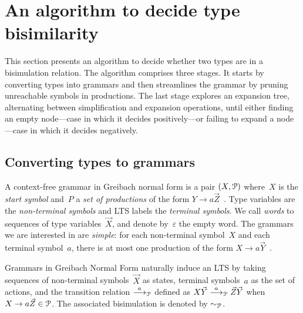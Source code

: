 \section{An algorithm to decide type bisimilarity}
\label{sec:algorithm}



This section presents an algorithm to decide whether two types are in
a bisimulation relation. The algorithm comprises three stages. It
starts by converting types into grammars and then streamlines the
grammar by pruning unreachable symbols in productions. The last stage
explores an expansion tree, alternating between simplification and
expansion operations, until either finding an empty node---case in
which it decides positively---or failing to expand a node---case in
which it decides negatively.

\subsection{Converting types to grammars}
\label{subsec:typeToGrammar}

A context-free grammar in Greibach normal form is a pair
$(X,\mathcal P)$ where~$X$ is the \emph{start symbol} and~$P$ a
\emph{set of productions} of the form
$Y \rightarrow a\vec Z$~\cite{GNF}. Type variables are the
\emph{non-terminal symbols} and LTS labels the \emph{terminal
  symbols}. We call \emph{words} to sequences of type
variables~$\vec X$, and denote by~$\varepsilon$ the empty word.
%
The grammars we are interested in are \emph{simple}: for each
non-terminal symbol~$X$ and each terminal symbol~$a$, there is at most
one production of the form
$X \rightarrow a\vec Y$~\cite{simpleGrammar}. 

Grammars in Greibach Normal Form naturally induce an LTS by taking
sequences of non-terminal symbols~$\vec X$ as states, terminal
symbols~$a$ as the set of actions, and the transition relation
$\stackrel{a}{\longrightarrow}_\mathcal P$ defined as $X\vec Y\stackrel{a}{\longrightarrow}_\mathcal P \vec Z\vec Y$ when
$X \rightarrow a\vec Z \in\mathcal P$.  The
associated bisimulation is denoted by $\sim_\mathcal P$.

